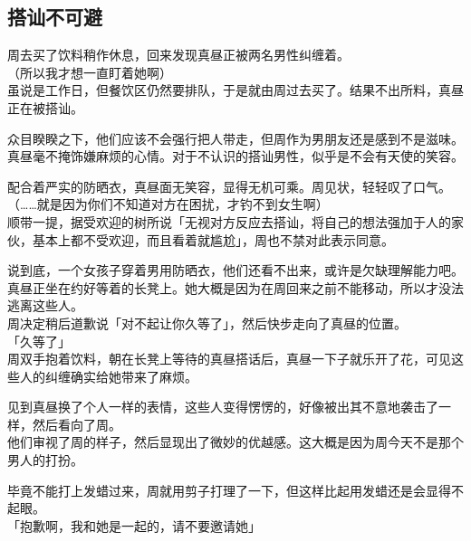 \subsection{搭讪不可避}

周去买了饮料稍作休息，回来发现真昼正被两名男性纠缠着。\\

（所以我才想一直盯着她啊）\\

虽说是工作日，但餐饮区仍然要排队，于是就由周过去买了。结果不出所料，真昼正在被搭讪。

众目睽睽之下，他们应该不会强行把人带走，但周作为男朋友还是感到不是滋味。\\

真昼毫不掩饰嫌麻烦的心情。对于不认识的搭讪男性，似乎是不会有天使的笑容。

配合着严实的防晒衣，真昼面无笑容，显得无机可乘。周见状，轻轻叹了口气。\\

（……就是因为你们不知道对方在困扰，才钓不到女生啊）\\

顺带一提，据受欢迎的树所说「无视对方反应去搭讪，将自己的想法强加于人的家伙，基本上都不受欢迎，而且看着就尴尬」，周也不禁对此表示同意。

说到底，一个女孩子穿着男用防晒衣，他们还看不出来，或许是欠缺理解能力吧。\\

真昼正坐在约好等着的长凳上。她大概是因为在周回来之前不能移动，所以才没法逃离这些人。\\

周决定稍后道歉说「对不起让你久等了」，然后快步走向了真昼的位置。\\

「久等了」\\

周双手抱着饮料，朝在长凳上等待的真昼搭话后，真昼一下子就乐开了花，可见这些人的纠缠确实给她带来了麻烦。

见到真昼换了个人一样的表情，这些人变得愣愣的，好像被出其不意地袭击了一样，然后看向了周。\\

他们审视了周的样子，然后显现出了微妙的优越感。这大概是因为周今天不是那个男人的打扮。

毕竟不能打上发蜡过来，周就用剪子打理了一下，但这样比起用发蜡还是会显得不起眼。\\

「抱歉啊，我和她是一起的，请不要邀请她」\\

